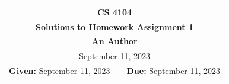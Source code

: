 \documentclass[11pt,twoside]{article}
\newcommand{\coursenumber}{CS 4104}
\newcommand{\docdate}{August 30, 2023}
\newcommand{\duedate}{September 11, 2023}
\newcommand{\homeworknumber}{1}
\newcommand{\doctitle}{Solutions to Homework Assignment \homeworknumber}
\newcommand{\doctitle}{Homework Assignment \homeworknumber}
\renewcommand{\docdate}{\duedate}
\renewcommand{\author}{An Author}
\begin{document}
	
	\thispagestyle{empty}
	
	\begin{center}
		\begin{tabular}{lcr}
			\multicolumn{3}{c}{\Large\textbf{\coursenumber}}
			\\[0.04in]
			\multicolumn{3}{c}{\Large\textbf{\doctitle}}
			\ifthenelse{\boolean{solutions}}{%
				\\[0.04in]\multicolumn{3}{c}{\large\textbf{\author}}
			}{} %
			\ifthenelse{\boolean{solutions}}{%
				\\[0.10in]\multicolumn{3}{c}{\duedate}
			}{%
				\\[0.10in]
				\textbf{Given:} \docdate
				& \hspace*{1.0in} &
				\textbf{Due:} \duedate
			}
		\end{tabular}
	\end{center}
	
\end{document}
